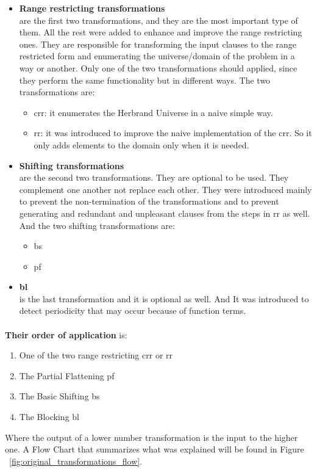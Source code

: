 		\begin{itemize}
			\item \textbf{Range restricting transformations}
			 \hfill \\ are the first two transformations, and they are the most important type of them. All the rest were added to enhance and improve the range restricting ones. They are responsible for transforming the input clauses to the range restricted form and enumerating the universe/domain of the problem in a way or another. Only one of the two transformations should applied, since they perform the same functionality but in different ways. The two transformations are:
			 	\begin{itemize}
			 		\item \ac{crr}: it enumerates the Herbrand Universe in a naive simple way. 
			 		\item \ac{rr}: it was introduced to improve the naive implementation of the \ac{crr}. So it only adds elements to the domain only when it is needed.
			 	\end{itemize}
			
			\item \textbf{Shifting transformations}
			 \hfill \\ are the second two transformations. They are optional to be used. They complement one another not replace each other. They were introduced mainly to prevent the non-termination of the transformations and to prevent generating and redundant and unpleasant clauses from the steps in \ac{rr} as well. And the two shifting transformations are:
			 	\begin{itemize}
			 		\item \ac{bs}
			 		\item \ac{pf}
			 	\end{itemize}
			
			\item \textbf{\ac{bl}}
			 \hfill \\ is the last transformation and it is optional as well. And It was introduced to detect periodicity that may occur because of function terms. 
		\end{itemize}
		
		\paragraph{} \textbf{Their order of application} is:
			\begin{enumerate}
				\item One of the two range restricting \ac{crr} or \ac{rr}
				\item The Partial Flattening \ac{pf}
				\item The Basic Shifting \ac{bs}
				\item The Blocking \ac{bl} 
			\end{enumerate}			 
		Where the output of a lower number transformation is the input to the higher one. A Flow Chart that summarizes what was explained will be found in Figure ~\ref{fig:original_transformations_flow}.
		
